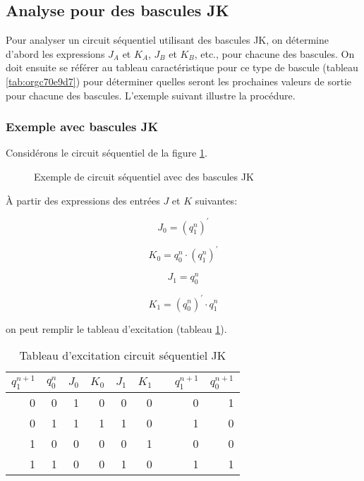 \documentclass[11pt]{article}
\begin{document}
\subsection{Analyse pour des bascules JK}
\label{sec:org1f2aa60}

Pour analyser un circuit séquentiel utilisant des bascules JK, on
détermine d'abord les expressions \(J_A\) et \(K_A\), \(J_B\) et
\(K_B\), etc., pour chacune des bascules. On doit ensuite se référer
au tableau caractéristique pour ce type de bascule (tableau
\ref{tab:orgc70e9d7}) pour déterminer quelles seront les prochaines valeurs
de sortie pour chacune des bascules. L'exemple suivant illustre la
procédure.

\subsubsection{Exemple avec bascules JK}
\label{sec:orgd37b421}
Considérons le circuit séquentiel de la figure \ref{fig:orgc4f2508}.

\begin{figure}[htbp]
\centering

\caption{\label{fig:orgc4f2508}Exemple de circuit séquentiel avec des bascules JK}
\end{figure}

À partir des expressions des entrées \(J\) et \(K\) suivantes:

$$ J_0 = (q_1^{n})^\prime $$

$$ K_0 = q_0^{n} \cdot (q_1^{n})^\prime $$

$$ J_1 = q_0^{n} $$

$$ K_1 = (q_0^{n})^\prime \cdot q_1^{n} $$

on peut remplir le tableau d'excitation (tableau \ref{tab:orgd642e67}).

\begin{table}[htbp]
\caption{\label{tab:orgd642e67}Tableau d'excitation circuit séquentiel JK}
\centering
\begin{tabular}{rrrrrrlrr}
\(q_1^{n+1}\) & \(q_0^n\) & \(J_0\) & \(K_0\) & \(J_1\) & \(K_1\) &  & \(q_1^{n+1}\) & \(q_0^{n+1}\)\\[0pt]
\hline
0 & 0 & 1 & 0 & 0 & 0 &  & 0 & 1\\[0pt]
0 & 1 & 1 & 1 & 1 & 0 &  & 1 & 0\\[0pt]
1 & 0 & 0 & 0 & 0 & 1 &  & 0 & 0\\[0pt]
1 & 1 & 0 & 0 & 1 & 0 &  & 1 & 1\\[0pt]
\end{tabular}
\end{table}
\end{document}
